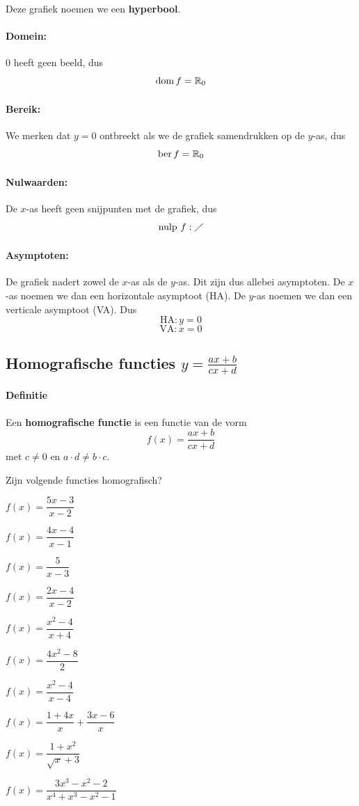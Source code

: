 \documentclass[12pt,twoside,a4paper]{article}
\begin{document}
Deze grafiek noemen we een {\bf hyperbool}.

\paragraph{Domein:}
0 heeft geen beeld, dus
$$\dom f = \mathbb{R}_0$$

\paragraph{Bereik:}
We merken dat $y=0$ ontbreekt als we de grafiek samendrukken op de $y$-as, dus
$$\ber f = \mathbb{R}_0$$
\paragraph{Nulwaarden:}
De $x$-as heeft geen snijpunten met de grafiek, dus
$$\mbox{nulp } f: \diagup$$

\paragraph{Asymptoten:}
De grafiek nadert zowel de $x$-as als de $y$-as. Dit zijn dus allebei asymptoten. De $x$-as noemen we dan een horizontale asymptoot (HA). De $y$-as noemen we dan een verticale asymptoot (VA). Dus
$$\text{HA}: y=0$$
$$\text{VA}: x=0$$

\subsection{Homografische functies $y=\frac{ax+b}{cx+d}$}

\paragraph*{Definitie}
\begin{mdframed}
Een {\bf homografische functie} is een functie van de vorm
$$f(x)=\dfrac{ax+b}{cx+d}$$
met $c\neq 0$ en $a\cdot d\neq b\cdot c$.
\end{mdframed}

\begin{oefening}
Zijn volgende functies homografisch?
\begin{exlist}{2}
  \item $f(x)=\dfrac{5x-3}{x-2}$
  \item $f(x)=\dfrac{4x-4}{x-1}$
  \item $f(x)=\dfrac{5}{x-3}$
  \item $f(x)=\dfrac{2x-4}{x-2}$
  \item $f(x)=\dfrac{x^2-4}{x+4}$
  \item $f(x)=\dfrac{4x^2-8}{2}$
  \item $f(x)=\dfrac{x^2-4}{x-4}$
  \item $f(x)=\dfrac{1+4x}{x}+\dfrac{3x-6}{x}$
  \item $f(x)=\dfrac{1+x^2}{\sqrt{x}+3}$
  \item $f(x)=\dfrac{3x^3-x^2-2}{x^4+x^3-x^2-1}$
\end{exlist}
\end{oefening}
\end{document}
